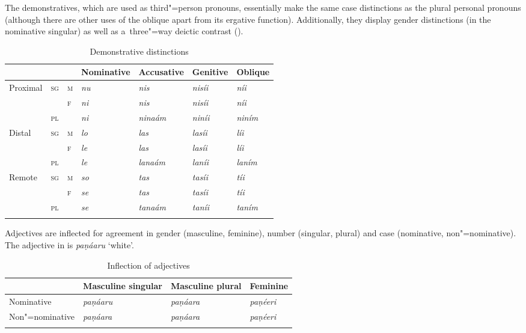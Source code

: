 The demonstratives, which are used as third"=person pronouns, essentially make the same case distinctions as the plural personal pronouns (although there are other uses of the oblique apart from its ergative function). Additionally, they display gender distinctions (in the nominative singular) as well as a~three"=way deictic contrast ().


\begin{table}[ht]
\caption{Demonstrative distinctions}
\begin{tabularx}{\textwidth}{ l l l Q Q Q Q }
\lsptoprule
&
&
&
Nominative &
Accusative &
Genitive &
Oblique \\\hline
Proximal &
\textsc{sg} &
\textsc{m} &
\textit{nu} &
\textit{nis} &
\textit{nisíi} &
\textit{níi} \\
&
&
\textsc{f} &
\textit{ni} &
\textit{nis} &
\textit{nisíi} &
\textit{níi} \\
&
\textsc{pl} &
&
\textit{ni} &
\textit{ninaám} &
\textit{niníi} &
\textit{niním} \\
Distal &
\textsc{sg} &
\textsc{m} &
\textit{lo} &
\textit{las} &
\textit{lasíi} &
\textit{líi} \\
&
&
\textsc{f} &
\textit{le} &
\textit{las} &
\textit{lasíi} &
\textit{líi} \\
&
\textsc{pl} &
&
\textit{le} &
\textit{lanaám} &
\textit{laníi} &
\textit{laním} \\
Remote &
\textsc{sg} &
\textsc{m} &
\textit{so} &
\textit{tas} &
\textit{tasíi} &
\textit{tíi} \\
&
&
\textsc{f} &
\textit{se} &
\textit{tas} &
\textit{tasíi} &
\textit{tíi} \\
&
\textsc{pl} &
&
\textit{se} &
\textit{tanaám} &
\textit{taníi} &
\textit{taním} \\\lspbottomrule
\end{tabularx}
\label{tab:2-dem}
\end{table}


Adjectives are inflected for agreement in gender (masculine, feminine), number (singular, plural) and case (nominative, non"=nominative). The adjective in  is \textit{paṇáaru} `white'.


\begin{table}[ht]
\caption{Inflection of adjectives}
\begin{tabularx}{\textwidth}{ l l l Q }
\lsptoprule
&
Masculine singular &
Masculine plural &
Feminine\\\hline
Nominative &
\textit{paṇáaru} &
\textit{paṇáara} &
\textit{paṇéeri} \\
Non"=nominative &
\textit{paṇáara} &
\textit{paṇáara} &
\textit{paṇéeri} \\\lspbottomrule
\end{tabularx}
\label{tab:2-adj}
\end{table}


